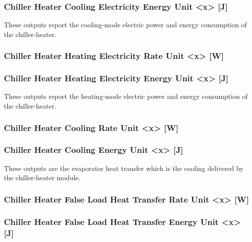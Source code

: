 \subsubsection{Chiller Heater Cooling Electricity Energy Unit \textless{}x\textgreater{} {[}J{]}}\label{chiller-heater-cooling-electric-energy-unit-x-j}

These outputs report the cooling-mode electric power and energy consumption of the chiller-heater.

\subsubsection{Chiller Heater Heating Electricity Rate Unit \textless{}x\textgreater{} {[}W{]}}\label{chiller-heater-heating-electric-power-unit-x-w}

\subsubsection{Chiller Heater Heating Electricity Energy Unit \textless{}x\textgreater{} {[}J{]}}\label{chiller-heater-heating-electric-energy-unit-x-j}

These outputs report the heating-mode electric power and energy consumption of the chiller-heater.

\subsubsection{Chiller Heater Cooling Rate Unit \textless{}x\textgreater{} {[}W{]}}\label{chiller-heater-cooling-rate-unit-x-w}

\subsubsection{Chiller Heater Cooling Energy Unit \textless{}x\textgreater{} {[}J{]}}\label{chiller-heater-cooling-energy-unit-x-j}

These outputs are the evaporator heat transfer which is the cooling delivered by the chiller-heater module.

\subsubsection{Chiller Heater False Load Heat Transfer Rate Unit \textless{}x\textgreater{} {[}W{]}}\label{chiller-heater-false-load-heat-transfer-rate-unit-x-w}

\subsubsection{Chiller Heater False Load Heat Transfer Energy Unit \textless{}x\textgreater{} {[}J{]}}\label{chiller-heater-false-load-heat-transfer-energy-unit-x-j}

